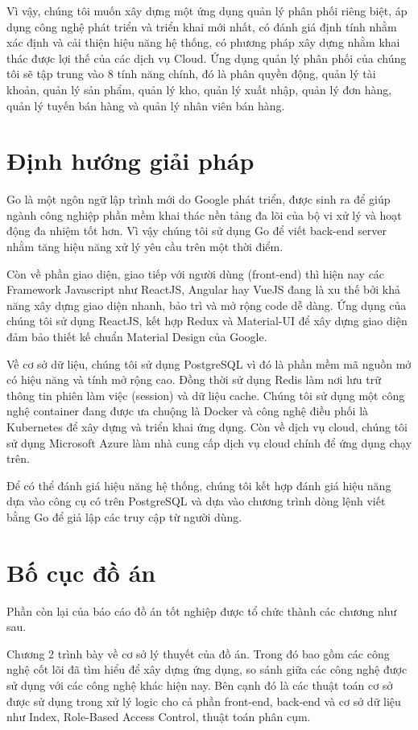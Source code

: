 Vì vậy, chúng tôi muốn xây dựng một ứng dụng quản lý phân phối riêng biệt,
áp dụng công nghệ phát triển và triển khai mới nhất, có đánh giá định tính
nhằm xác định và cải thiện hiệu năng hệ thống, có phương pháp xây dựng
nhằm khai thác được lợi thế của các dịch vụ Cloud. Ứng dụng quản lý
phân phối của chúng tôi sẽ tập trung vào 8 tính năng chính,
đó là phân quyền động, quản lý tài khoản, quản lý sản phẩm, quản lý kho,
quản lý xuất nhập, quản lý đơn hàng, quản lý tuyến bán
hàng và quản lý nhân viên bán hàng.

\section{Định hướng giải pháp}
Go là một ngôn ngữ lập trình mới do Google phát triển,
được sinh ra để giúp ngành công nghiệp phần mềm khai thác nền
tảng đa lõi của bộ vi xử lý và hoạt động đa nhiệm tốt hơn.
Vì vậy chúng tôi sử dụng Go để viết back-end server nhằm tăng hiệu
năng xử lý yêu cầu trên một thời điểm.

Còn về phần giao diện, giao tiếp với người dùng (front-end) thì hiện
nay các Framework Javascript như ReactJS, Angular hay VueJS đang
là xu thế bởi khả năng xây dựng giao diện nhanh, bảo trì và
mở rộng code dễ dàng. Ứng dụng của chúng tôi sử dụng ReactJS, kết hợp Redux và
Material-UI để xây dựng giao diện đảm bảo thiết kế
chuẩn Material Design của Google. 

Về cơ sở dữ liệu, chúng tôi sử dụng PostgreSQL vì đó là phần mềm mã nguồn
mở có hiệu năng và tính mở rộng cao. Đồng thời sử dụng Redis làm nơi lưu
trữ thông tin phiên làm việc (session) và dữ liệu cache.
Chúng tôi sử dụng một công nghệ container đang được
ưa chuộng là Docker và công nghệ điều phối là Kubernetes để xây dựng
và triển khai ứng dụng. Còn về dịch vụ cloud, chúng tôi sử dụng Microsoft
Azure làm nhà cung cấp dịch vụ cloud chính để ứng dụng chạy trên.

Để có thể đánh giá hiệu năng hệ thống, chúng tôi kết hợp đánh giá hiệu năng
dựa vào công cụ có trên PostgreSQL và dựa vào chương trình dòng lệnh viết
bằng Go để giả lập các truy cập từ người dùng.

\section{Bố cục đồ án}
Phần còn lại của báo cáo đồ án tốt nghiệp được tổ
chức thành các chương như sau.

Chương 2 trình bày về cơ sở lý thuyết của đồ án. Trong đó bao gồm
các công nghệ cốt lõi đã tìm hiểu để xây dựng ứng dụng, so sánh
giữa các công nghệ được sử dụng với các công nghệ khác hiện nay.
Bên cạnh đó là các thuật toán cơ sở được sử dụng trong xử lý logic
cho cả phần front-end, back-end và cơ sở dữ liệu như Index,
Role-Based Access Control, thuật toán phân cụm. 

